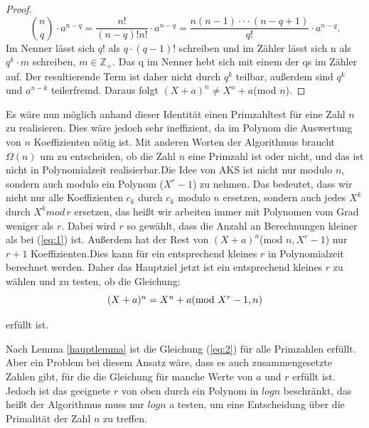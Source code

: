 \documentclass[12pt,oneside]{article}
\theoremstyle{remark}
\theoremstyle{definition}
\begin{document}
\begin{flushleft}
\begin{proof}
\begin{equation}
    {n \choose q} \cdot a^{n-q} = \frac{n!}{(n-q)! n!} \cdot a^{n-q} = \frac{n(n-1)\cdot \cdot \cdot (n-q+1)}{q!} \cdot a^{n-q}.
\end{equation}
\newline\newline
Im Nenner lässt sich $q!$ als $q \cdot (q-1)!$ schreiben und im Zähler lässt sich n als $q^k\cdot m$ schreiben, $m \in \mathbb{Z}_{+}$. Das q im Nenner hebt sich mit einem der qs im Zähler auf. Der resultierende Term ist daher nicht durch $q^k$ teilbar, außerdem sind $q^k$ und $a^{n-k}$ teilerfremd. Daraus folgt $(X + a)^n \neq X^n + a $(mod $n$).
\end{proof}

Es wäre nun möglich anhand dieser Identität einen Primzahltest für eine Zahl $n$ zu realisieren. Dies wäre jedoch sehr ineffizient, da im Polynom die Auswertung von $n$ Koeffizienten nötig ist. Mit anderen Worten der Algorithmus braucht $\Omega(n)$ um zu entscheiden, ob die Zahl $n$ eine Primzahl ist oder nicht, und das ist nicht in Polynomialzeit realisierbar.\newline\newline Die Idee von AKS ist nicht nur modulo $n$, sondern auch modulo ein Polynom ($X^r -1$) zu nehmen. Das bedeutet, dass wir nicht nur alle Koeffizienten $c_{k}$ durch $c_{k}$ modulo $n$ ersetzen, sondern auch jedes $X^k$ durch $X^k mod \, r$ ersetzen, das heißt wir arbeiten immer mit Polynomen vom Grad weniger als $r$. Dabei wird $r$ so gewählt, dass die Anzahl an Berechnungen kleiner als bei (\ref{eq:1}) ist. Außerdem hat der Rest von $(X + a)^n$(mod $ n, X^r - 1$) nur $ r + 1$ Koeffizienten.\newline Dies kann für ein entsprechend kleines $r$ in Polynomialzeit berechnet werden. Daher das Hauptziel jetzt ist ein entsprechend kleines $r$ zu wählen und zu testen, ob die Gleichung:\newline\newline
\begin{equation}\label{eq:2}
    \centerline{$(X + a)^n = X^n + a $(mod $X^r - 1, n$)}
\end{equation}

erfüllt ist.\newline

Nach Lemma \ref{hauptlemma} ist die Gleichung (\ref{eq:2}) für alle Primzahlen erfüllt. Aber ein Problem bei diesem Ansatz wäre, dass es auch zusammengesetzte Zahlen gibt, für die die Gleichung für manche Werte von $a$ und $r$ erfüllt ist. Jedoch ist das geeignete $r$ von oben durch ein Polynom in $log n$ beschränkt, das heißt der Algorithmus muss nur $log n$ a testen, um eine Entscheidung über die Primalität der Zahl $n$ zu treffen.

\end{flushleft}
\end{document}
